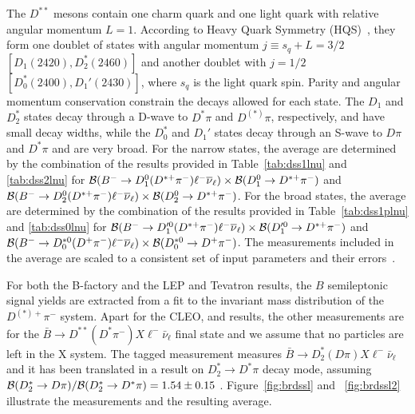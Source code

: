 \label{slbdecays_dsslnu}

The $D^{**}$ mesons contain one charm quark and one light quark with relative angular momentum $L=1$. According to Heavy Quark Symmetry (HQS)~\cite{Isgur:1991wq}, they form one doublet of states with angular momentum $j \equiv s_q + L= 3/2$  $\left[D_1(2420), D_2^*(2460)\right]$ and another doublet with $j=1/2$ $\left[D^*_0(2400), D_1'(2430)\right]$, where $s_q$ is the light quark spin. Parity and angular momentum conservation constrain the decays allowed for each state. The $D_1$ and $D_2^*$ states decay through a D-wave to $D^*\pi$ and $D^{(*)}\pi$, respectively, and have small decay widths, while the $D_0^*$ and $D_1'$  states decay through an S-wave to $D\pi$ and $D^*\pi$ and are very broad.
For the narrow states, the average  are determined by the
combination of the results provided in Table~\ref{tab:dss1lnu} and \ref{tab:dss2lnu} for 
$\cbf(B^- \to D_1^0(D^{*+}\pi^-)\ell^-\bar{\nu}_{\ell})
\times \cbf(D_1^0 \to D^{*+}\pi^-)$ and $\cbf(B^- \to D_2^0(D^{*+}\pi^-)\ell^-\bar{\nu}_{\ell})
\times \cbf(D_2^0 \to D^{*+}\pi^-)$. 
For the broad states, the average are determined by the
combination of the results provided in Table~\ref{tab:dss1plnu} and \ref{tab:dss0lnu} for 
$\cbf(B^- \to D_1'^0(D^{*+}\pi^-)\ell^-\bar{\nu}_{\ell})
\times \cbf(D_1'^0 \to D^{*+}\pi^-)$ and $\cbf(B^- \to D_0^{*0}(D^{+}\pi^-)\ell^-\bar{\nu}_{\ell})
\times \cbf(D_0^{*0} \to D^{+}\pi^-)$. 
The measurements included in the average are scaled to a consistent set of input
parameters and their errors~\cite{HFAG_sl:inputparams}.  

For both the B-factory and the LEP and Tevatron results, the $B$ semileptonic 
signal yields are extracted from a fit to the invariant mass distribution of the $D^{(*)+}\pi^-$ system.
 Apart for the CLEO, \belle and \babar results, the other measurements 
 are for the $\bar{B} \to D^{**}(D^*\pi^-)X \ell^- \bar{\nu}_{\ell}$ final state and 
 we assume that no particles are left in the X system. The \babar tagged measurement \cite{Aubert:2009_4} measures 
 $\bar{B} \to D_2^*(D\pi)X \ell^- \bar{\nu}_{\ell}$ and it has been translated in 
 a result on  $D_2^*\to D^*\pi$ decay mode, assuming 
 ${\cal B}(D_2^*\to D\pi)/{\cal B}(D_2^*\to D^*\pi)=1.54\pm 0.15$ \cite{PDG_2014}. 
Figure~\ref{fig:brdssl} and ~\ref{fig:brdssl2} illustrate the measurements and the
resulting average.






